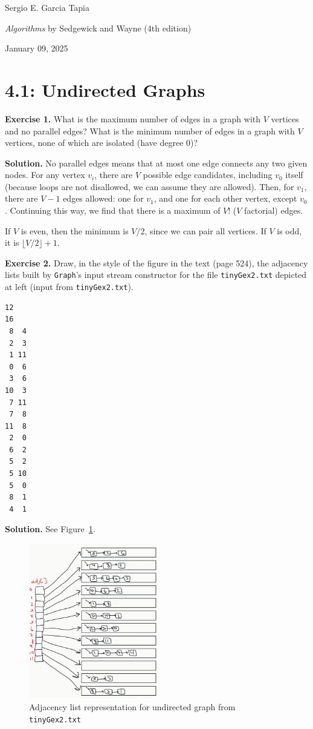 \documentclass[12pt, a4paper]{article}
\newenvironment{ex}[2][Exercise]
{\par\medskip\noindent \textbf{#1 #2.}}
{\medskip}
\newenvironment{sol}[1][Solution]
{\par\medskip\noindent \textbf{#1.} }
{\medskip}
\begin{document}
	\noindent Sergio E. Garcia Tapia \hfill
	
	\noindent \emph{Algorithms} by Sedgewick and Wayne (4th edition) \cite{sedgewick_wayne}\hfill
	
	\noindent January 09, 2025\hfill 
	\section*{4.1: Undirected Graphs}
	\begin{ex}{1}
		What is the maximum number of edges in a graph with $V$ vertices and no parallel
		edges? What is the minimum number of edges in a graph with $V$ vertices, none of
		which are isolated (have degree $0$)?
	\end{ex}
	\begin{sol}
		No parallel edges means that at most one edge connects any two given nodes.
		For any vertex $v_i$, there are $V$ possible edge candidates, including $v_0$
		itself (because loops are not disallowed, we can assume they are allowed).
		Then, for $v_1$, there are $V-1$ edges allowed: one for $v_1$, and one for each
		other vertex, except $v_0$. Continuing this way, we find that there is
		a maximum of $V!$ ($V$ factorial) edges.
		
		If $V$ is even, then the minimum is $V / 2$, since we can pair all vertices.
		If $V$ is odd, it is $\lfloor V / 2\rfloor + 1$.
	\end{sol}
	\begin{ex}{2}
		Draw, in the style of the figure in the text (page 524), the adjacency lists
		built by \texttt{Graph}'s input stream constructor for the file \texttt{tinyGex2.txt}
		depicted at left (input from \texttt{tinyGex2.txt}).
		\begin{lstlisting}[language={}]
12
16
 8  4
 2  3
 1 11
 0  6
 3  6
10  3
 7 11
 7  8
11  8
 2  0
 6  2
 5  2
 5 10
 5  0
 8  1
 4  1
		\end{lstlisting}
	\end{ex}
	\begin{sol}
		See Figure~\ref{fig:ex-02}.
		\begin{figure}
			\centering
			\includegraphics[width=0.5\textwidth]{exercise-02}
			\caption{Adjacency list representation for undirected graph from \texttt{tinyGex2.txt}}
			\label{fig:ex-02}
		\end{figure}
	\end{sol}
\end{document}
